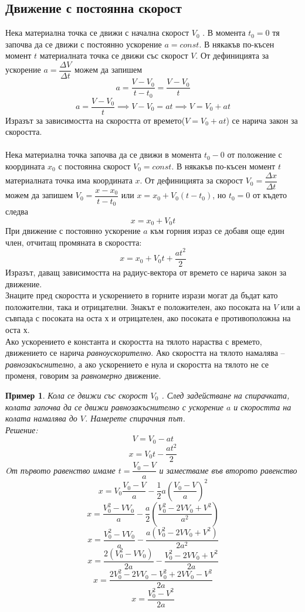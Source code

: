 \documentclass[fleqn]{article}
\newtheorem{example}{Пример}[subsection]
\begin{document}
\subsection{Движение с постоянна скорост}
Нека материална точка се движи с начална скорост $V_0$ . В момента $t_0 = 0$ тя започва да се движи с постоянно ускорение $a = const$. В някакъв по-късен момент $t$ материалната точка се движи със скорост $V$. От дефиницията за ускорение  $ a =\dfrac{\Delta V}{\Delta t}$ можем да запишем 
$$a = \dfrac{V - V_0}{t - t_0} = \dfrac{V - V_0}{t}$$
$$a = \dfrac{V - V_0}{t} \implies V - V_0 = at \implies V = V_0 + at$$
Изразът за зависимостта на скоростта от времето($V = V_0 + at$) се нарича закон за скоростта. \\
\\
Нека материална точка започва да се движи в момента $t_0 - 0$ от положение с координата $x_0$ с постоянна скорост  $V_0 = const$. В някакъв по-късен момент $t$ материалната точка има координата $x$. От дефиницията за скорост  $V_0 = \dfrac{\Delta x}{\Delta t}$ можем да запишем $V_0 = \dfrac{x-x_0}{t - t_0}$ или $x = x_0 + V_0(t-t_0)$, но $t_0 = 0$ от където следва 
$$x = x_0 + V_0t$$
При движение с постоянно ускорение $a$ към горния израз се добавя още един член, отчитащ промяната в скоростта: 
$$x = x_0 + V_0t + \dfrac{at^2}{2}$$
Изразът, даващ зависимостта на радиус-вектора от времето се нарича закон за движение. \\
Знаците пред скоростта и ускорението в горните изрази могат да бъдат като положителни, така и отрицателни. Знакът е положителен, ако посоката на $V$ или а съвпада с посоката на оста х и отрицателен, ако посоката е противоположна на оста х.\\
Ако ускорението е константа и скоростта на тялото нараства с времето, движението се нарича \textit{равноускорително}. Ако скоростта на тялото намалява – \textit{равнозакъснително}, а ако ускорението е нула и скоростта на тялото не се променя, говорим за \textit{равномерно} движение.

\begin{example}
Кола се движи със скорост $V_0$ . След задействане на спирачката, колата започва да се движи равнозакъснително с ускорение $a$ и скоростта на колата намалява до $V$. Намерете спирачния път.\\
Решение:
$$V = V_0 - at$$
$$x = V_0t - \dfrac{at^2}{2}$$
Oт първото равенство имаме $t = \dfrac{V_0 - V}{a}$ и заместваме във второто равенство
$$x = V_0 \dfrac{V_0 - V}{a} - \dfrac{1}{2}a \left( \dfrac{V_0 - V}{a}\right)^2 $$
$$x = \dfrac{V_0 ^2 - VV_0}{a} -  \dfrac{a}{2}  \left( \dfrac{V_0 ^2 - 2VV_0 + V^2}{a^2}\right)$$ 
$$x =\dfrac{V_0 ^2 - VV_0}{a} - \dfrac{a(V_0 ^2 - 2VV_0 + V^2)}{2a^2}$$
$$x = \dfrac{2(V_0 ^2 - VV_0)}{2a} - \dfrac{V_0 ^2 - 2VV_0 + V^2}{2a}$$
$$x = \dfrac{2V_0 ^2 - 2VV_0 - V_0 ^2 + 2VV_0 - V^2}{2a}$$
$$x = \dfrac{V_0 ^2 - V^2}{2a}$$
\end{example}
\end{document}
